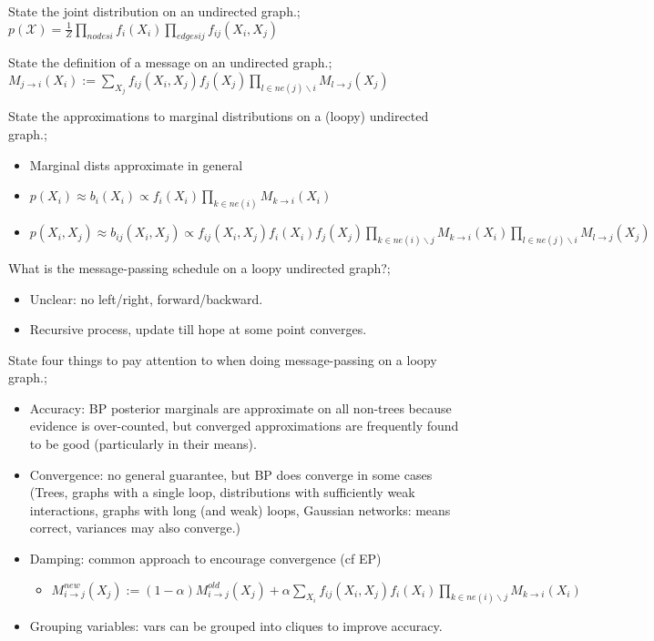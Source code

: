 \documentclass{article}
\begin{document}
State the joint distribution on an undirected graph.; $p(\mathcal{X}) = \frac{1}{Z}\prod_{nodes i}f_i(X_i)\prod_{edges ij}f_{ij}(X_i, X_j)$

State the definition of a message on an undirected graph.; $M_{j\rightarrow i}(X_i) := \sum_{X_j}f_{ij}(X_i, X_j)f_j(X_j)\prod_{l\in ne(j) \backslash i}M_{l\rightarrow j}(X_j)$

State the approximations to marginal distributions on a (loopy) undirected graph.; \begin{itemize}
    \item Marginal dists approximate in general
    \item $p(X_i)\approx b_i(X_i) \propto f_i(X_i)\prod_{k\in ne(i) }M_{k\rightarrow i}(X_i)$
    \item $p(X_i, X_j) \approx b_{ij}(X_i, X_j) \propto f_{ij}(X_i, X_j)f_i(X_i)f_j(X_j)\prod_{k\in ne(i)\backslash j}M_{k\rightarrow i}(X_i)\prod_{l\in ne(j)\backslash i}M_{l\rightarrow j}(X_j)$
\end{itemize}

What is the message-passing schedule on a loopy undirected graph?; \begin{itemize}
    \item Unclear: no left/right, forward/backward.
    \item Recursive process, update till hope at some point converges.
\end{itemize}

State four things to pay attention to when doing message-passing on a loopy graph.; \begin{itemize}
    \item Accuracy: BP posterior marginals are approximate on all non-trees because evidence is over-counted, but converged approximations are frequently found to be good (particularly in their means).
    \item Convergence: no general guarantee, but BP does converge in some cases (Trees, graphs with a single loop, distributions with sufficiently weak interactions, graphs with long (and weak) loops, Gaussian networks: means correct, variances may also converge.)
    \item Damping: common approach to encourage convergence (cf EP) \begin{itemize}
        \item $M^{new}_{i\rightarrow j}(X_j):= (1-\alpha)M^{old}_{i\rightarrow j}(X_j) + \alpha\sum_{X_i}f_{ij}(X_i, X_j)f_i(X_i)\prod_{k\in ne(i)\backslash j}M_{k\rightarrow i}(X_i)$
    \end{itemize}
    \item Grouping variables: vars can be grouped into cliques to improve accuracy.
\end{itemize}
\end{document}

